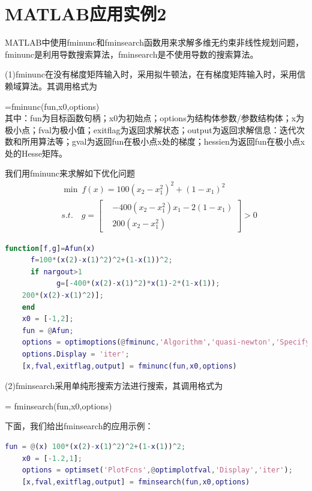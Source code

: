 \section{MATLAB应用实例2}
    \par
    MATLAB中使用fminunc和fminsearch函数用来求解多维无约束非线性规划问题，fminunc是利用导数搜索算法，fminsearch是不使用导数的搜索算法。
    \par
    (1)fminunc在没有梯度矩阵输入时，采用拟牛顿法，在有梯度矩阵输入时，采用信赖域算法。其调用格式为
    \par
    [x,fval,exitflag,output,grad,hession]=fminunc(fun,x0,options)\\
    其中：fun为目标函数句柄；x0为初始点；options为结构体参数/参数结构体；x为极小点；fval为极小值；exitflag为返回求解状态；output为返回求解信息：迭代次数和所用算法等；gval为返回fun在极小点x处的梯度；hessien为返回fun在极小点x处的Hesse矩阵。
    \par
    我们用fminunc来求解如下优化问题
    \begin{align*}
    & \min \ f(x) = 100(x_2-x_1^2)^2 + (1-x_1)^2\\
    & s.t.\quad g=\left[
        \begin{aligned}
        &-400(x_2-x_1^2)x_1-2(1-x_1)\\
        & 200(x_2-x_1^2)
        \end{aligned}
        \right]
        >0
    \end{align*}
    \begin{lstlisting}[language=Matlab]
    function[f,g]=Afun(x)
      f=100*(x(2)-x(1)^2)^2+(1-x(1))^2;
      if nargout>1
            g=[-400*(x(2)-x(1)^2)*x(1)-2*(1-x(1));
    200*(x(2)-x(1)^2)];
    end
    x0 = [-1,2];
    fun = @Afun;
    options = optimoptions(@fminunc,'Algorithm','quasi-newton','SpecifyobjectiveGrident',true);
    options.Display = 'iter';
    [x,fval,exitflag,output] = fminunc(fun,x0,options)
    \end{lstlisting}
    \par
    (2)fminsearch采用单纯形搜索方法进行搜索，其调用格式为
    \par
    [x,fval,exitflag,output] = fminsearch(fun,x0,options)
    \par
    下面，我们给出fminsearch的应用示例：
    \begin{lstlisting}[language = Matlab]
    fun = @(x) 100*(x(2)-x(1)^2)^2+(1-x(1))^2;
    x0 = [-1.2,1];
    options = optimset('PlotFcns',@optimplotfval,'Display','iter');
    [x,fval,exitflag,output] = fminsearch(fun,x0,options)
    \end{lstlisting}

